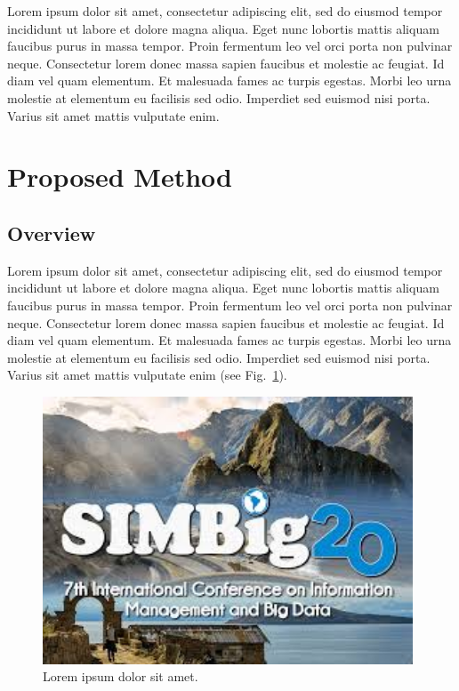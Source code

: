 \documentclass[runningheads]{llncs}
\begin{document}
Lorem ipsum dolor sit amet, consectetur adipiscing elit, sed do eiusmod tempor incididunt ut labore et dolore magna aliqua. Eget nunc lobortis mattis aliquam faucibus purus in massa tempor. Proin fermentum leo vel orci porta non pulvinar neque. Consectetur lorem donec massa sapien faucibus et molestie ac feugiat. Id diam vel quam elementum. Et malesuada fames ac turpis egestas. Morbi leo urna molestie at elementum eu facilisis sed odio. Imperdiet sed euismod nisi porta. Varius sit amet mattis vulputate enim.




\section{Proposed Method}

\subsection{Overview}

Lorem ipsum dolor sit amet, consectetur adipiscing elit, sed do eiusmod tempor incididunt ut labore et dolore magna aliqua. Eget nunc lobortis mattis aliquam faucibus purus in massa tempor. Proin fermentum leo vel orci porta non pulvinar neque. Consectetur lorem donec massa sapien faucibus et molestie ac feugiat. Id diam vel quam elementum. Et malesuada fames ac turpis egestas. Morbi leo urna molestie at elementum eu facilisis sed odio. Imperdiet sed euismod nisi porta. Varius sit amet mattis vulputate enim (see Fig.~\ref{figure1}).

\begin{figure}[!htbp]
\centerline{\includegraphics[width=110mm]{images/image-example.jpeg}}
\caption{Lorem ipsum dolor sit amet.} \label{figure1}
\end{figure}
\end{document}
